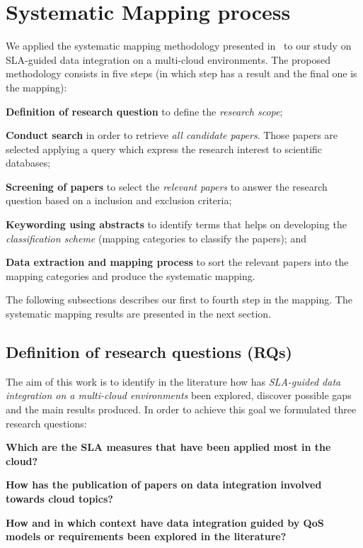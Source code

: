 \section{Systematic Mapping process}

We applied the systematic mapping methodology presented in~\cite{SM:Petersen:2008} to our study on SLA-guided data integration on a multi-cloud environments. 
The proposed methodology consists in five steps (in which step has a result and the final one is the mapping):

\begin{description}
\item \textbf{Definition of research question} to define the \textit{research scope};
\item \textbf{Conduct search} in order to retrieve \textit{all candidate papers}. Those papers are selected applying a query which express the research interest to scientific databases;
\item  \textbf{Screening of papers} to select the \textit{relevant papers} to answer the research question based on a inclusion and exclusion criteria;
\item \textbf{Keywording using abstracts} to identify terms that helps on developing the \textit{classification scheme} (mapping categories to classify the papers); and
\item \textbf{Data extraction and mapping process} to sort the relevant papers into the mapping categories and produce the systematic mapping.
\end{description}

\bigskip The following subsections describes our first to fourth step in the
mapping. The systematic mapping results are presented in the next section.   
 
\subsection{Definition of research questions (RQs)}
The aim of this work is to identify in the literature how has \textit{SLA-guided
data integration on a multi-cloud environments} been explored, discover possible
gaps and the main results produced.    
In order to achieve this goal we formulated three research questions:
\begin{description}
\item \textbf{Which are the SLA measures that have been applied most in the cloud?}
\item \textbf{How has the publication of papers on data integration involved towards cloud topics?}
\item \textbf{How and in which context have data integration guided by QoS models or requirements been explored in the literature?}
\end{description}

